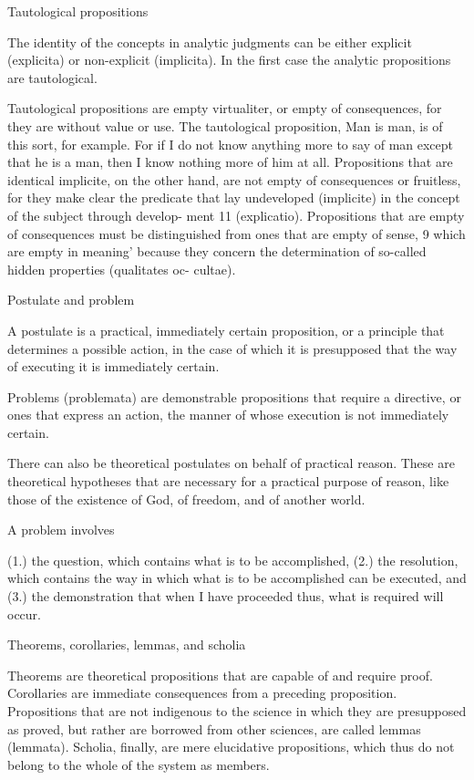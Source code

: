 Tautological propositions

The identity of the concepts in analytic judgments can be either explicit
(explicita) or non-explicit (implicita).
In the first case the analytic propositions are tautological.

    Tautological propositions are empty virtualiter, or empty of consequences,
    for they are without value or use. The tautological proposition, Man is
    man, is of this sort, for example. For if I do not know anything more to say
    of man except that he is a man, then I know nothing more of him at all.
    Propositions that are identical implicite, on the other hand, are not
    empty of consequences or fruitless, for they make clear the predicate that
    lay undeveloped (implicite) in the concept of the subject through develop-
    ment 11 (explicatio).
    Propositions that are empty of consequences must be distinguished from
    ones that are empty of sense, 9 which are empty in meaning' because they
    concern the determination of so-called hidden properties (qualitates oc-
    cultae).

Postulate and problem

A postulate is a practical, immediately certain proposition, or a principle
that determines a possible action, in the case of which it is presupposed
that the way of executing it is immediately certain.

Problems (problemata) are demonstrable propositions that require a directive,
or ones that express an action, the manner of whose execution is not immediately certain.

    There can also be theoretical postulates on behalf of practical reason.
    These are theoretical hypotheses that are necessary for a practical purpose of reason,
    like those of the existence of God, of freedom, and of another world.

    A problem involves

    (1.) the question, which contains what is to be accomplished,
    (2.) the resolution, which contains the way in which what is
    to be accomplished can be executed, and
    (3.) the demonstration that when I have proceeded thus, what is required will occur.

Theorems, corollaries, lemmas, and scholia

Theorems are theoretical propositions that are capable of and require proof.
Corollaries are immediate consequences from a preceding proposition.
Propositions that are not indigenous to the science in which they are
presupposed as proved, but rather are borrowed from other sciences, are
called lemmas (lemmata).
Scholia, finally, are mere elucidative propositions,
which thus do not belong to the whole of the system as members.

